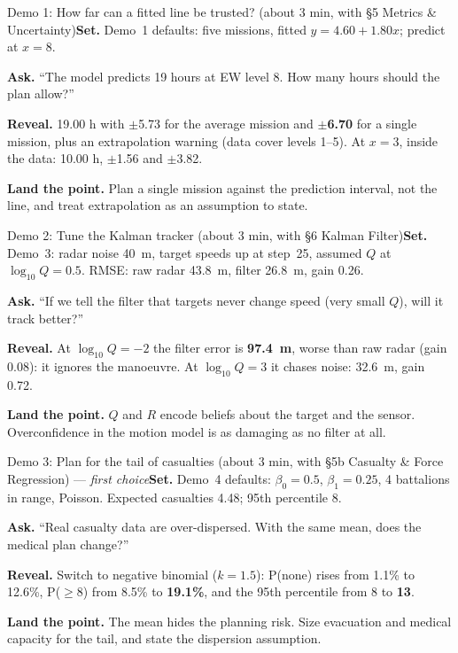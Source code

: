\documentclass[11pt]{article}
\begin{document}
\begin{live}{Demo 1: How far can a fitted line be trusted? (about 3 min, with \S5 Metrics \& Uncertainty)}\textbf{Set.} Demo~1 defaults: five missions, fitted $y=4.60+1.80x$; predict at $x=8$.\par\smallskip\textbf{Ask.} ``The model predicts 19 hours at EW level 8. How many hours should the plan allow?''\par\smallskip\textbf{Reveal.} 19.00 h with $\pm$5.73 for the average mission and \textbf{$\pm$6.70} for a single mission, plus an extrapolation warning (data cover levels 1--5). At $x=3$, inside the data: 10.00 h, $\pm$1.56 and $\pm$3.82.\par\smallskip\textbf{Land the point.} Plan a single mission against the prediction interval, not the line, and treat extrapolation as an assumption to state.\end{live}

\begin{live}{Demo 2: Tune the Kalman tracker (about 3 min, with \S6 Kalman Filter)}\textbf{Set.} Demo~3: radar noise 40~m, target speeds up at step~25, assumed $Q$ at $\log_{10}Q=0.5$. RMSE: raw radar 43.8~m, filter 26.8~m, gain 0.26.\par\smallskip\textbf{Ask.} ``If we tell the filter that targets never change speed (very small $Q$), will it track better?''\par\smallskip\textbf{Reveal.} At $\log_{10}Q=-2$ the filter error is \textbf{97.4~m}, worse than raw radar (gain 0.08): it ignores the manoeuvre. At $\log_{10}Q=3$ it chases noise: 32.6~m, gain 0.72.\par\smallskip\textbf{Land the point.} $Q$ and $R$ encode beliefs about the target and the sensor. Overconfidence in the motion model is as damaging as no filter at all.\end{live}

\begin{live}{Demo 3: Plan for the tail of casualties (about 3 min, with \S5b Casualty \& Force Regression) --- \emph{first choice}}\textbf{Set.} Demo~4 defaults: $\beta_0=0.5$, $\beta_1=0.25$, 4 battalions in range, Poisson. Expected casualties 4.48; 95th percentile 8.\par\smallskip\textbf{Ask.} ``Real casualty data are over-dispersed. With the same mean, does the medical plan change?''\par\smallskip\textbf{Reveal.} Switch to negative binomial ($k=1.5$): P(none) rises from 1.1\% to 12.6\%, P($\geq$8) from 8.5\% to \textbf{19.1\%}, and the 95th percentile from 8 to \textbf{13}.\par\smallskip\textbf{Land the point.} The mean hides the planning risk. Size evacuation and medical capacity for the tail, and state the dispersion assumption.\end{live}
\end{document}

